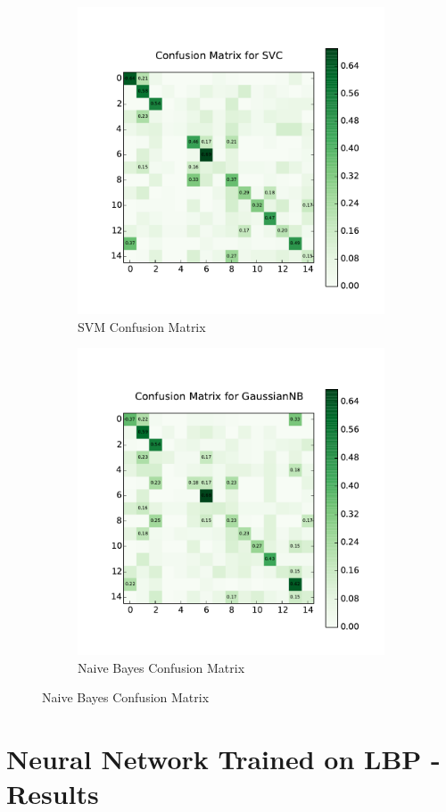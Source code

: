 \begin{figure}[ht]
	\begin{subfigure}{.5\textwidth}
	\includegraphics[width=.8\linewidth]{images/baseline/cm_svm.pdf}
	\caption{SVM Confusion Matrix}
	\end{subfigure}
	
	\begin{subfigure}{.5\textwidth}
	\includegraphics[width=.8\linewidth]{images/baseline/cm_naive_bayes.pdf}
	\caption{Naive Bayes Confusion Matrix}
	\end{subfigure}
\end{figure}

\section{Neural Network Trained on LBP - Results} \label{appendix:images}




